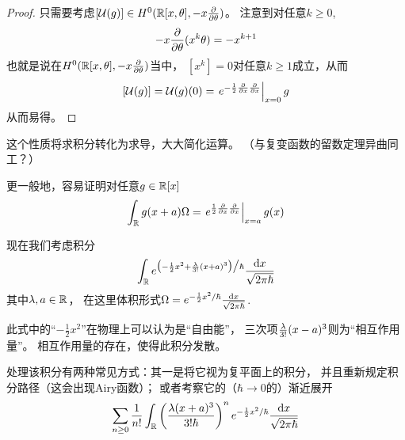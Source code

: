 \begin{proof}
只需要考虑$[\mathcal{U}(g)]\in H^0(\mathbb{R}[x,\theta],-x\frac{\partial } {\partial \theta})$。
注意到对任意$k\geq 0$,
$$-x\frac{\partial } {\partial \theta}(x^k\theta)=-x^{k+1}$$
也就是说在$H^0(\mathbb{R}[x,\theta],-x\frac{\partial } {\partial \theta})$当中，
$[x^k]=0$对任意$k\geq 1$成立，从而
$$[\mathcal{U}(g)]=\mathcal{U}(g)(0)
=\left.
   e^{-\frac{1}{2}\frac{\partial } {\partial x}\frac{\partial } {\partial x}}
 \right|_{x=0}g
$$
从而易得。
\end{proof}
这个性质将求积分转化为求导，大大简化运算。
（与复变函数的留数定理异曲同工？）

更一般地，容易证明对任意$g\in\mathbb{R}[x]$
$$\int_{\mathbb{R}}g(x+a)\Omega=
\left.
  e^{\frac{1}{2}\frac{\partial } {\partial x}\frac{\partial } {\partial x}}
\right|_{x=a}g(x)$$

\begin{Example}现在我们考虑积分%
$$
  \int_{\mathbb{R}}
    e^{\big(-\frac{1}{2}x^2+\frac{\lambda}{3!}(x+a)^3\big)\big/\hbar}
    \frac{\mathrm{d} x}{\sqrt{2\pi\hbar}}
$$
其中$\lambda,a\in\mathbb{R}$，
在这里体积形式$\Omega=e^{-\frac{1}{2}x^2/\hbar}
\frac{\mathrm{d} x}{\sqrt{2\pi\hbar}}$.
\end{Example}

此式中的“$-\frac{1}{2}x^2$”在物理上可以认为是“自由能”，
三次项$\frac{\lambda}{3!}(x-a)^3$则为“相互作用量”。
相互作用量的存在，使得此积分发散。

处理该积分有两种常见方式：其一是将它视为复平面上的积分，
并且重新规定积分路径（这会出现Airy函数）；
或者考察它的（$\hbar\to 0$的）渐近展开
$$
  \sum_{n\geq 0}\frac{1}{n!}
    \int_{\mathbb{R}}
      \left(
        \frac{\lambda (x+a)^3}{3!\hbar}
      \right)^n
      e^{-\frac{1}{2}x^2/\hbar}
      \frac{\mathrm{d} x}{\sqrt{2\pi\hbar}}
$$


